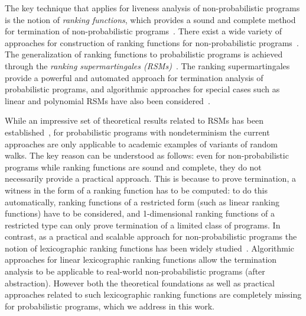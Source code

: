 \smallskip{}
The key technique that applies for liveness analysis of non-probabilistic programs is 
the notion of {\em ranking functions}, which provides a sound and complete 
method for termination of non-probabilistic programs~\cite{rwfloyd1967programs}.
There exist a wide variety of approaches for construction 
of ranking functions for non-probabilistic programs~\cite{DBLP:conf/cav/BradleyMS05,DBLP:conf/tacas/ColonS01,DBLP:conf/vmcai/PodelskiR04,DBLP:conf/pods/SohnG91}.
The generalization of ranking functions to probabilistic programs is achieved through the
{\em ranking supermartingales (RSMs)}~\cite{SriramCAV,HolgerPOPL,CF17}.
The ranking supermartingales provide a powerful and automated approach for termination 
analysis of probabilistic programs, and algorithmic approaches for special cases such as 
linear and polynomial RSMs have also been considered~\cite{SriramCAV,CFNH16:prob-termination,CFG16,CNZ17}.



\smallskip{} 
While an impressive set of theoretical results related to RSMs has been
established~\cite{SriramCAV,HolgerPOPL,CF17,CFNH16:prob-termination,CFG16,CNZ17},
 for probabilistic programs with nondeterminism the current approaches  
are only applicable to academic examples of variants of random walks. 
The key reason can be understood as follows: even for non-probabilistic programs while 
ranking functions are sound and complete, they do not necessarily provide a practical 
approach. This is because to prove termination, a witness in the form of a 
ranking function has to be computed: to do this automatically, ranking 
functions 
of a restricted form (such as linear ranking functions) have to be considered, 
and 1-dimensional ranking functions of a restricted type can only prove 
termination of a limited class of programs. 
In contrast, as a practical and scalable approach for non-probabilistic programs the 
notion of lexicographic ranking functions has been widely 
studied~\cite{CSZ13,ADFG10:lexicographic,GMR15:rank-extremal,BCIKP16:T2}. 
Algorithmic approaches for linear lexicographic ranking functions allow the 
termination analysis 
to be applicable to real-world non-probabilistic programs (after abstraction).
However both the theoretical foundations as well as practical approaches related to 
such lexicographic ranking functions are completely missing for probabilistic programs,
which we address in this work.







